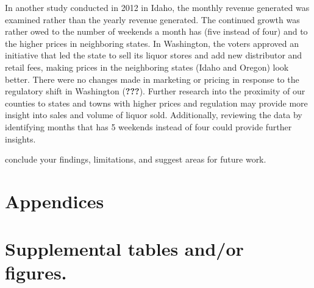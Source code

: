 \documentclass[]{elsarticle} %
\begin{document}
In another study conducted in 2012 in Idaho, the monthly revenue
generated was examined rather than the yearly revenue generated. The
continued growth was rather owed to the number of weekends a month has
(five instead of four) and to the higher prices in neighboring states.
In Washington, the voters approved an initiative that led the state to
sell its liquor stores and add new distributor and retail fees, making
prices in the neighboring states (Idaho and Oregon) look better. There
were no changes made in marketing or pricing in response to the
regulatory shift in Washington ({\textbf{???}}). Further research into
the proximity of our counties to states and towns with higher prices and
regulation may provide more insight into sales and volume of liquor
sold. Additionally, reviewing the data by identifying months that has 5
weekends instead of four could provide further insights.

conclude your findings, limitations, and suggest areas for future work.

\newpage

\section{Appendices}\label{appendices}

\section{Supplemental tables and/or
figures.}\label{supplemental-tables-andor-figures.}
\end{document}
